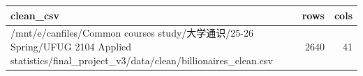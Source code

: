 \begin{tabular}{lrr}
\toprule
clean\_csv & rows & cols \\
\midrule
/mnt/e/canfiles/Common courses study/大学通识/25-26 Spring/UFUG 2104 Applied statistics/final\_project\_v3/data/clean/billionaires\_clean.csv & 2640 & 41 \\
\bottomrule
\end{tabular}
